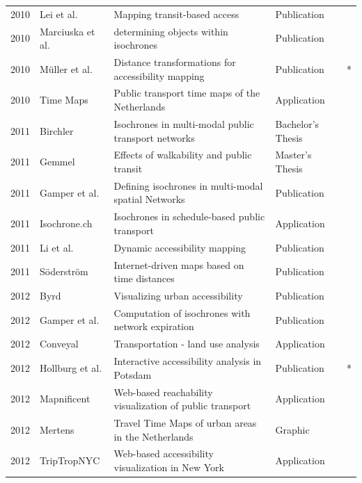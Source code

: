 \begin{table}[htb]
\begin{tabular}{r|l|l|l|c}
        2010 & Lei et al. \cite{lei2010mapping} & Mapping transit-based access  & Publication  & \\
        2010 & Marciuska et al. \cite{marciuska2010determining} & determining objects within isochrones  & Publication  & \\
        2010 & Müller et al. \cite{Mueller2010} & Distance transformations for accessibility mapping  &  Publication & * \\
        2010 & Time Maps \cite{TimeMaps} & Public transport time maps of the Netherlands & Application  & \\
        2011 & Birchler \cite{birchler2011computing} & Isochrones in multi-modal public transport networks  & Bachelor's Thesis  & \\
        2011 & Gemmel \cite{gemmel2012hedonic} &  Effects of walkability and public transit & Master's Thesis  & \\
        2011 & Gamper et al. \cite{gamper2011defining} & Defining isochrones in multi-modal spatial Networks & Publication  & \\
        2011 & Isochrone.ch \cite{IsochroneCh}  & Isochrones in schedule-based public transport  & Application  & \\
        2011 & Li et al. \cite{li2011dynamic} & Dynamic accessibility mapping  & Publication  & \\
        2011 & Söderström \cite{soderstrom2011personal} & Internet-driven maps based on time distances  & Publication  & \\
        2012 & Byrd \cite{Byrd2012} & Visualizing urban accessibility  & Publication  & \\
        2012 & Gamper et al. \cite{gamper2012scalable} & Computation of isochrones with network expiration  & Publication  & \\
        2012 & Conveyal \cite{Conveyal} & Transportation - land use analysis  & Application  & \\
        2012 & Hollburg et al. \cite{hollburghier} & Interactive accessibility analysis in Potsdam & Publication  & * \\
        2012 & Mapnificent \cite{Mapnificent}  & Web-based reachability visualization of public transport  & Application  & \\
        2012 & Mertens \cite{meertens2012} & Travel Time Maps of urban areas in the Netherlands  & Graphic  & \\
        2012 & TripTropNYC \cite{TriptropNYC} & Web-based accessibility visualization in New York  & Application  & \\

\end{tabular}
\end{table}
